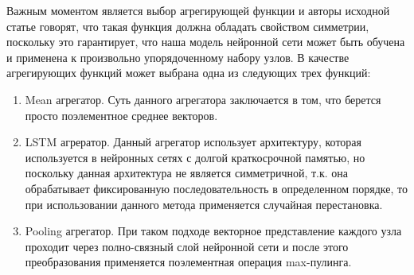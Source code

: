 Важным моментом является выбор агрегирующей функции и авторы исходной статье говорят, что такая функция должна обладать свойством симметрии, поскольку это гарантирует, что наша модель нейронной сети может быть обучена и применена к произвольно упорядоченному набору узлов. В качестве агрегирующих функций может выбрана одна из следующих трех функций:
\begin{enumerate}
\item Mean агрегатор. Суть данного агрегатора заключается в том, что берется просто поэлементное среднее векторов.
\item LSTM агрератор. Данный агрегатор использует архитектуру, которая используется в нейронных сетях с долгой краткосрочной памятью, но поскольку данная архитектура не является симметричной, т.к. она обрабатывает фиксированную последовательность в определенном порядке, то при использовании данного метода применяется случайная перестановка.
\item Pooling агрегатор.  При таком подходе векторное представление каждого узла проходит через полно-связный слой нейронной сети и после этого преобразования применяется поэлементная операция max-пулинга.
\end{enumerate}





\clearpage